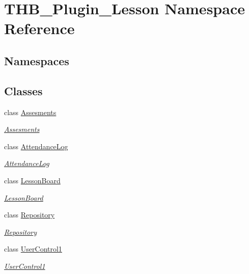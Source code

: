 \hypertarget{namespace_t_h_b___plugin___lesson}{}\section{T\+H\+B\+\_\+\+Plugin\+\_\+\+Lesson Namespace Reference}
\label{namespace_t_h_b___plugin___lesson}
\subsection*{Namespaces}
\begin{DoxyCompactItemize}
\end{DoxyCompactItemize}
\subsection*{Classes}
\begin{DoxyCompactItemize}
\item 
class \mbox{\hyperlink{class_t_h_b___plugin___lesson_1_1_assesments}{Assesments}}
\begin{DoxyCompactList}\small\item\em \mbox{\hyperlink{class_t_h_b___plugin___lesson_1_1_assesments}{Assesments}} \end{DoxyCompactList}\item 
class \mbox{\hyperlink{class_t_h_b___plugin___lesson_1_1_attendance_log}{Attendance\+Log}}
\begin{DoxyCompactList}\small\item\em \mbox{\hyperlink{class_t_h_b___plugin___lesson_1_1_attendance_log}{Attendance\+Log}} \end{DoxyCompactList}\item 
class \mbox{\hyperlink{class_t_h_b___plugin___lesson_1_1_lesson_board}{Lesson\+Board}}
\begin{DoxyCompactList}\small\item\em \mbox{\hyperlink{class_t_h_b___plugin___lesson_1_1_lesson_board}{Lesson\+Board}} \end{DoxyCompactList}\item 
class \mbox{\hyperlink{class_t_h_b___plugin___lesson_1_1_repository}{Repository}}
\begin{DoxyCompactList}\small\item\em \mbox{\hyperlink{class_t_h_b___plugin___lesson_1_1_repository}{Repository}} \end{DoxyCompactList}\item 
class \mbox{\hyperlink{class_t_h_b___plugin___lesson_1_1_user_control1}{User\+Control1}}
\begin{DoxyCompactList}\small\item\em \mbox{\hyperlink{class_t_h_b___plugin___lesson_1_1_user_control1}{User\+Control1}} \end{DoxyCompactList}\end{DoxyCompactItemize}
